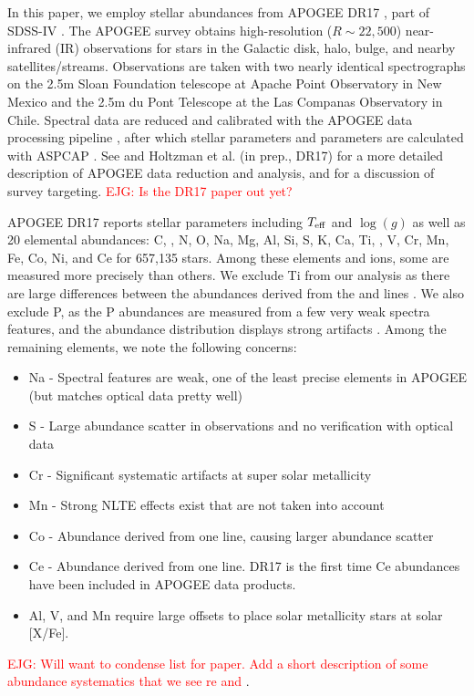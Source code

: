 \documentclass[modern]{aastex631}
\newcommand{\logg}{\log(g)}
\newcommand{\teff}{T_{\rm eff}}
\newcommand{\ejg}[1]{\textcolor{red}{EJG: #1}}
\begin{document}
In this paper, we employ stellar abundances from APOGEE DR17 \citep{abdurrouf2022}, part of SDSS-IV \citep{majewski2017}. The APOGEE survey obtains high-resolution ($R\sim22,500$) near-infrared (IR) observations \citep{wilson2019} for stars in the Galactic disk, halo, bulge, and nearby satellites/streams. Observations are taken with two nearly identical spectrographs on the 2.5m Sloan Foundation telescope \citep{wilson2019} at Apache Point Observatory in New Mexico and the 2.5m du Pont Telescope \citep{bowen1973} at the Las Companas Observatory in Chile. Spectral data are reduced and calibrated with the APOGEE data processing pipeline \citep{nidever2015}, after which stellar parameters and parameters are calculated with ASPCAP \citep[APOGEE Stellar Parameter and Chemical Abundance Pipeline][]{holtzman2015, garcia2016}. See \citet[][DR16]{jonsson2020} and Holtzman et al. (in prep., DR17) for a more detailed description of APOGEE data reduction and analysis, and \citep{zasowski2013, zasowski2017, santana2021} for a discussion of survey targeting.
\ejg{Is the DR17 paper out yet?}

APOGEE DR17 reports stellar parameters including $\teff$ and $\logg$ as well as 20 elemental abundances: C, , N, O, Na, Mg, Al, Si, S, K, Ca, Ti, , V, Cr, Mn, Fe, Co, Ni, and Ce for 657,135 stars. Among these elements and ions, some are measured more precisely than others. We exclude Ti from our analysis as there are large differences between the abundances derived from the  and  lines \citep{jonsson2020}. We also exclude P, as the P abundances are measured from a few very weak spectra features, and the abundance distribution displays strong artifacts \citep{jonsson2020}. Among the remaining elements, we note the following concerns:
\begin{itemize}
\itemsep0em
    \item Na - Spectral features are weak, one of the least precise elements in APOGEE (but matches optical data pretty well)
    \item S - Large abundance scatter in observations and no verification with optical data
    \item Cr - Significant systematic artifacts at super solar metallicity \citep{griffith2021a}
    \item Mn - Strong NLTE effects exist that are not taken into account
    \item Co - Abundance derived from one line, causing larger abundance scatter
    \item Ce - Abundance derived from one line. DR17 is the first time Ce abundances have been included in APOGEE data products. 
    \item Al,  V, and Mn require large offsets to place solar metallicity stars at solar [X/Fe].
\end{itemize}
\ejg{Will want to condense list for paper. Add a short description of some abundance systematics that we see re \citet{jonsson2020} and \citet{griffith2021a}}.
\end{document}
